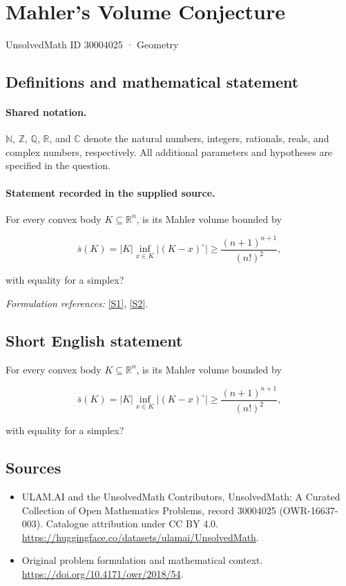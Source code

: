 \documentclass[11pt]{article}
\newcommand{\sref}[2]{\hyperlink{source:#1:#2}{[S#2]}}
\begin{document}
\setcounter{section}{30004024}
\section{Mahler’s Volume Conjecture}\label{30004025}
{\small UnsolvedMath ID 30004025 · Geometry}
\subsection{Definitions and mathematical statement}

\paragraph{Shared notation.}$\mathbb N$, $\mathbb Z$, $\mathbb Q$, $\mathbb R$, and $\mathbb C$ denote the natural numbers, integers, rationals, reals, and complex numbers, respectively. All additional parameters and hypotheses are specified in the question.


\paragraph{Statement recorded in the supplied source.}
For every convex body $K\subseteq\mathbb R^n$, is its Mahler volume bounded by

$$\bar s(K)=\lvert K\rvert\inf_{x\in K}\lvert(K-x)^\circ\rvert\geq\frac{(n+1)^{n+1}}{(n!)^2},$$

with equality for a simplex?
\par\smallskip\textit{Formulation references:} \sref{30004025}{1}, \sref{30004025}{2}.
\subsection{Short English statement}
For every convex body $K\subseteq\mathbb R^n$, is its Mahler volume bounded by

$$\bar s(K)=\lvert K\rvert\inf_{x\in K}\lvert(K-x)^\circ\rvert\geq\frac{(n+1)^{n+1}}{(n!)^2},$$

with equality for a simplex?
\subsection{Sources}
\begin{itemize}
\item[\hypertarget{source:30004025:1}{S1}] ULAM.AI and the UnsolvedMath Contributors, UnsolvedMath: A Curated Collection of Open Mathematics Problems, record 30004025 (OWR-16637-003). Catalogue attribution under CC BY 4.0.
\url{https://huggingface.co/datasets/ulamai/UnsolvedMath}.
\item[\hypertarget{source:30004025:2}{S2}] Original problem formulation and mathematical context.
\url{https://doi.org/10.4171/owr/2018/54}.
\end{itemize}
\label{end:30004025}
\end{document}
